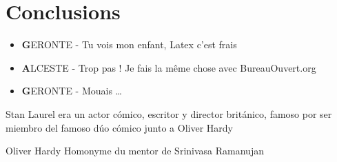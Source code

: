 \documentclass[twocolumn,a4paper]{IEEEtranfr}
\begin{document}
\section{Conclusions}
\begin{itemize}
  \item {\textbf GERONTE} - Tu vois mon enfant, Latex c'est frais
  \item {\textbf ALCESTE} - Trop pas  ! Je fais la même chose avec BureauOuvert.org
  \item {\textbf GERONTE} - Mouais \dots
\end{itemize}
%
%

%


{}
\begin{IEEEbiography}
{Stan Laurel } era un actor cómico, escritor y director británico,
famoso por ser miembro del famoso dúo cómico junto a Oliver Hardy 

\end{IEEEbiography}

\begin{IEEEbiography}
{Oliver Hardy} Homonyme du mentor de Srinivasa Ramanujan
\end{IEEEbiography}
\end{document}
